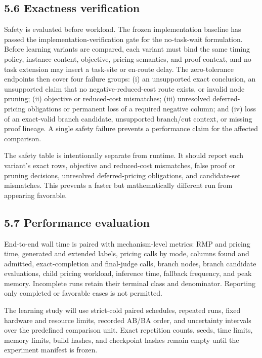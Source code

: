 \documentclass[
  11pt,
]{article}
\begin{document}
\hypertarget{exactness-verification}{%
\subsection{5.6 Exactness verification}\label{exactness-verification}}

Safety is evaluated before workload. The frozen implementation baseline
has passed the implementation-verification gate for the no-task-wait
formulation. Before learning variants are compared, each variant must
bind the same timing policy, instance content, objective, pricing
semantics, and proof context, and no task extension may insert a
task-site or en-route delay. The zero-tolerance endpoints then cover
four failure groups: (i) an unsupported exact conclusion, an unsupported
claim that no negative-reduced-cost route exists, or invalid node
pruning; (ii) objective or reduced-cost mismatches; (iii) unresolved
deferred-pricing obligations or permanent loss of a required negative
column; and (iv) loss of an exact-valid branch candidate, unsupported
branch/cut context, or missing proof lineage. A single safety failure
prevents a performance claim for the affected comparison.

The safety table is intentionally separate from runtime. It should
report each variant's exact rows, objective and reduced-cost mismatches,
false proof or pruning decisions, unresolved deferred-pricing
obligations, and candidate-set mismatches. This prevents a faster but
mathematically different run from appearing favorable.

\hypertarget{performance-evaluation}{%
\subsection{5.7 Performance evaluation}\label{performance-evaluation}}

End-to-end wall time is paired with mechanism-level metrics: RMP and
pricing time, generated and extended labels, pricing calls by mode,
columns found and admitted, exact-completion and final-judge calls,
branch nodes, branch candidate evaluations, child pricing workload,
inference time, fallback frequency, and peak memory. Incomplete runs
retain their terminal class and denominator. Reporting only completed or
favorable cases is not permitted.

The learning study will use strict-cold paired schedules, repeated runs,
fixed hardware and resource limits, recorded AB/BA order, and
uncertainty intervals over the predefined comparison unit. Exact
repetition counts, seeds, time limits, memory limits, build hashes, and
checkpoint hashes remain empty until the experiment manifest is frozen.
\end{document}
